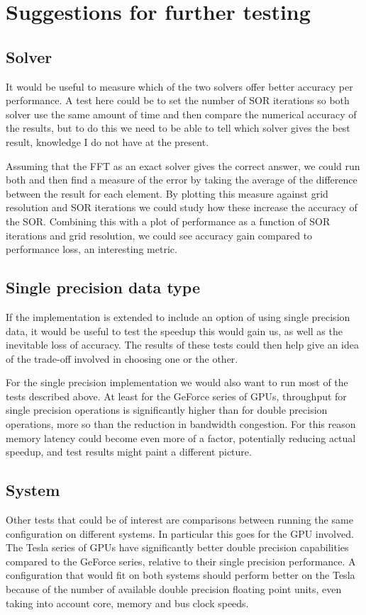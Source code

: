 \section{Suggestions for further testing}\label{sec:testing-further}
\subsection{Solver}
It would be useful to measure which of the two solvers offer better accuracy per performance. A test here could be to
set the number of SOR iterations so both solver use the same amount of time and then compare the numerical accuracy of
the results, but to do this we need to be able to tell which solver gives the best result, knowledge I do not have at
the present.

Assuming that the FFT as an exact solver gives the correct answer, we could run both and then find a measure of the
error by taking the average of the difference between the result for each element. By plotting this measure against grid
resolution and SOR iterations we could study how these increase the accuracy of the SOR. Combining this with a plot of
performance as a function of SOR iterations and grid resolution, we could see accuracy gain compared to performance loss,
an interesting metric.

\subsection{Single precision data type}
If the implementation is extended to include an option of using single precision data, it would be useful to test the
speedup this would gain us, as well as the inevitable loss of accuracy. The results of these tests could then help
give an idea of the trade-off involved in choosing one or the other.

For the single precision implementation we would also want to run most of the tests described above. At least for the
GeForce series of GPUs, throughput for single precision operations is significantly higher than for double precision
operations, more so than the reduction in bandwidth congestion. For this reason memory latency could become even more of
a factor, potentially reducing actual speedup, and test results might paint a different picture.

\subsection{System}Other tests that could be of interest are comparisons between running the same configuration on different systems. In
particular this goes for the GPU involved. The Tesla series of GPUs have significantly better double precision capabilities
compared to the GeForce series, relative to their single precision performance. A configuration that would fit on both
systems should perform better on the Tesla because of the number of available double precision floating point units,
even taking into account core, memory and bus clock speeds.
